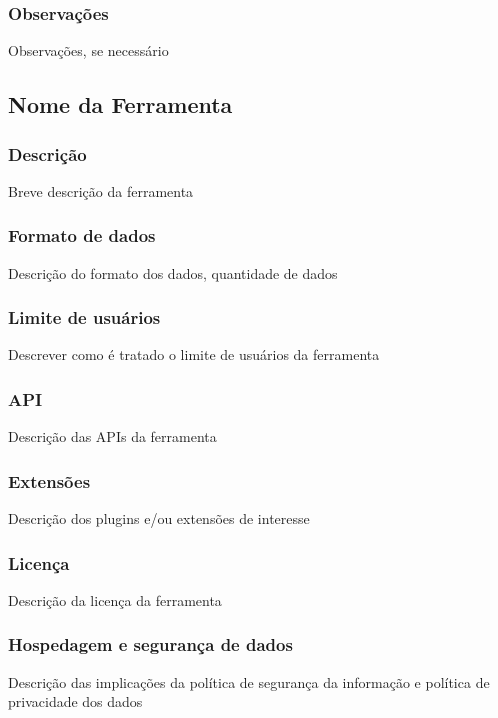 \documentclass[12pt]{article}
\begin{document}
\subsubsection{Observações}
Observações, se necessário

\clearpage

\subsection{Nome da Ferramenta}

\subsubsection{Descrição}
Breve descrição da ferramenta

\subsubsection{Formato de dados}
Descrição do formato dos dados, quantidade de dados

\subsubsection{Limite de usuários}
Descrever como é tratado o limite de usuários da ferramenta

\subsubsection{API}
Descrição das APIs da ferramenta

\subsubsection{Extensões}
Descrição dos plugins e/ou extensões de interesse

\subsubsection{Licença}
Descrição da licença da ferramenta

\subsubsection{Hospedagem e segurança de dados}
Descrição das implicações da política de segurança da informação e política de privacidade dos dados
\end{document}
